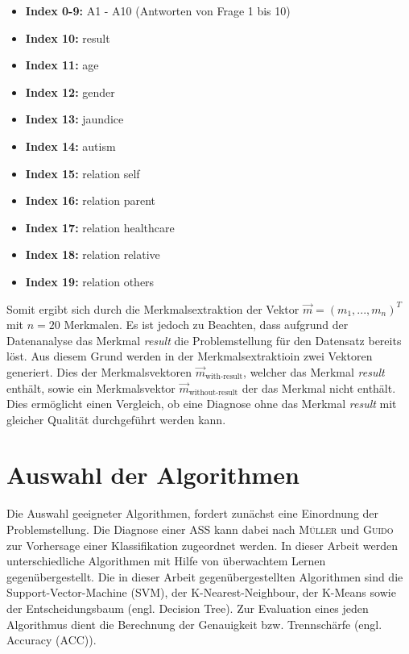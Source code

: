 \documentclass[conference]{IEEEtran}
\begin{document}
\begin{itemize}
	\item \textbf{Index 0-9:} A1 - A10 (Antworten von Frage 1 bis 10)
	\item \textbf{Index 10:} result
	\item \textbf{Index 11:} age 
	\item \textbf{Index 12:} gender
	\item \textbf{Index 13:} jaundice
	\item \textbf{Index 14:} autism
	\item \textbf{Index 15:} relation self
	\item \textbf{Index 16:} relation parent
	\item \textbf{Index 17:} relation healthcare
	\item \textbf{Index 18:} relation relative
	\item \textbf{Index 19:} relation others
\end{itemize}

Somit ergibt sich durch die Merkmalsextraktion der Vektor $\vec{m} = (m_1, ..., m_n)^T$ mit $n = 20$ Merkmalen. Es ist jedoch zu Beachten, dass aufgrund der Datenanalyse das Merkmal \textit{result} die Problemstellung für den Datensatz bereits löst. Aus diesem Grund werden in der Merkmalsextraktioin zwei Vektoren generiert. Dies der Merkmalsvektoren $\vec{m}_{\text{with-result}}$, welcher das Merkmal \textit{result} enthält, sowie ein Merkmalsvektor $\vec{m}_{\text{without-result}}$ der das Merkmal nicht enthält. Dies ermöglicht einen Vergleich, ob eine Diagnose ohne das Merkmal \textit{result} mit gleicher Qualität durchgeführt werden kann.

\section{Auswahl der Algorithmen} \label{sec:algorithms}
Die Auswahl geeigneter Algorithmen, fordert zunächst eine Einordnung der Problemstellung. Die Diagnose einer ASS kann dabei nach \textsc{Müller} und \textsc{Guido} \cite[S.~94]{Muller2016} zur Vorhersage einer Klassifikation zugeordnet werden. In dieser Arbeit werden unterschiedliche Algorithmen mit Hilfe von überwachtem Lernen \cite[S.~93]{Muller2016} gegenübergestellt. 
Die in dieser Arbeit gegenübergestellten Algorithmen sind die Support-Vector-Machine (SVM), der K-Nearest-Neighbour, der K-Means sowie der Entscheidungsbaum (engl. \glqq Decision Tree\grqq). %
Zur Evaluation eines jeden Algorithmus dient die Berechnung der Genauigkeit bzw. Trennschärfe (engl. \glqq Accuracy\grqq{} (ACC)).
\end{document}
